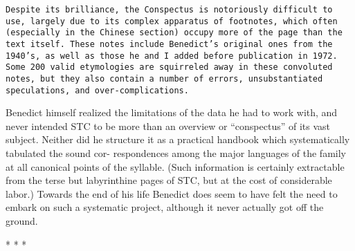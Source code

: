 {\tt Despite its brilliance, the Conspectus is notoriously difficult to use, largely due to its complex apparatus of footnotes, which often (especially in the Chinese section) occupy more of the page than the text itself. These notes include Benedict's original ones from the 1940's, as well as those he and I added before publication in 1972. Some 200 valid etymologies are squirreled away in these convoluted notes, but they also contain a number of errors, unsubstantiated speculations, and over-complications.

Benedict himself realized the limitations of the data he had to work with, and never intended STC to be more than an overview or ``conspectus'' of its vast subject. Neither did he structure it as a practical handbook which systematically tabulated the sound cor- respondences among the major languages of the family at all canonical points of the syllable. (Such information is certainly extractable from the terse but labyrinthine pages of STC, but at the cost of considerable labor.) Towards the end of his life Benedict does seem to have felt the need to embark on such a systematic project, although it never actually got off the ground.}

* * *

